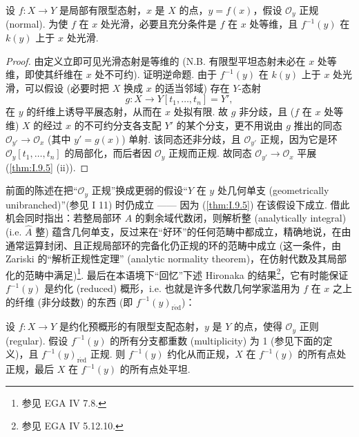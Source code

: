 \begin{proposition}\label{prop:II.2.3}
设 $f \colon X \to Y$ 是局部有限型态射，$x$ 是 $X$ 的点，$y = f(x)$，假设 $\mathcal{O}_y$ 正规 (normal). 为使 $f$ 在 $x$ 处光滑，必要且充分条件是 $f$ 在 $x$ 处等维，且 $f^{-1}(y)$ 在 $k(y)$ 上于 $x$ 处光滑.
\end{proposition}

\begin{proof}
由定义立即可见光滑态射是等维的 (N.B. 有限型平坦态射未必在 $x$ 处等维，即使其纤维在 $x$ 处不可约). 证明逆命题. 由于 $f^{-1}(y)$ 在 $k(y)$ 上于 $x$ 处光滑，可以假设 (必要时把 $X$ 换成 $x$ 的适当邻域) 存在 $Y$-态射
\[
g \colon X \longrightarrow Y[t_1, \dots, t_n] = Y',
\]
在 $y$ 的纤维上诱导平展态射，从而在 $x$ 处拟有限. 故 $g$ 非分歧，且 ($f$ 在 $x$ 处等维) $X$ 的经过 $x$ 的不可约分支各支配 $Y'$ 的某个分支，更不用说由 $g$ 推出的同态 $\mathcal{O}_{y'} \to \mathcal{O}_x$ (其中 $y' = g(x)$) 单射. 该同态还非分歧，且 $\mathcal{O}_{y'}$ 正规，因为它是环 $\mathcal{O}_y[t_1, \dots, t_n]$ 的局部化，而后者因 $\mathcal{O}_y$ 正规而正规. 故同态 $\mathcal{O}_{y'} \to \mathcal{O}_x$ 平展 (\ref{thm:I.9.5} (ii)).
\end{proof}

\begin{remark}\label{rem:II.2.4}
前面的陈述在把``$\mathcal{O}_y$ 正规''换成更弱的假设``$Y$ 在 $y$ 处几何单支 (geometrically unibranched)''(参见 I 11) 时仍成立 —— 因为 (\ref{thm:I.9.5}) 在该假设下成立. 借此机会同时指出：若整局部环 $A$ 的剩余域代数闭，则解析整 (analytically integral) (i.e. $\widehat{A}$ 整) 蕴含几何单支，反过来在``好环''的任何范畴中都成立，精确地说，在由通常运算封闭、且正规局部环的完备化仍正规的环的范畴中成立 (这一条件，由 Zariski 的``解析正规性定理'' (analytic normality theorem)，在仿射代数及其局部化的范畴中满足)\footnote{参见 EGA IV 7.8.}. 最后在本语境下``回忆''下述 Hironaka 的结果\footnote{参见 EGA IV 5.12.10.}，它有时能保证 $f^{-1}(y)$ 是约化 (reduced) 概形，i.e. 也就是许多代数几何学家滥用为 $f$ 在 $x$ 之上的纤维 (非分歧数) 的东西 (即 $f^{-1}(y)_{\mathrm{r\acute{e}d}}$)：
\end{remark}

\begin{proposition}\label{prop:II.2.5}
设 $f \colon X \to Y$ 是约化预概形的有限型支配态射，$y$ 是 $Y$ 的点，使得 $\mathcal{O}_y$ 正则 (regular). 假设 $f^{-1}(y)$ 的所有分支都重数 (multiplicity) 为 1 (参见下面的定义)，且 $f^{-1}(y)_{\mathrm{r\acute{e}d}}$ 正规. 则 $f^{-1}(y)$ 约化从而正规，$X$ 在 $f^{-1}(y)$ 的所有点处正规，最后 $X$ 在 $f^{-1}(y)$ 的所有点处平坦.
\end{proposition}

